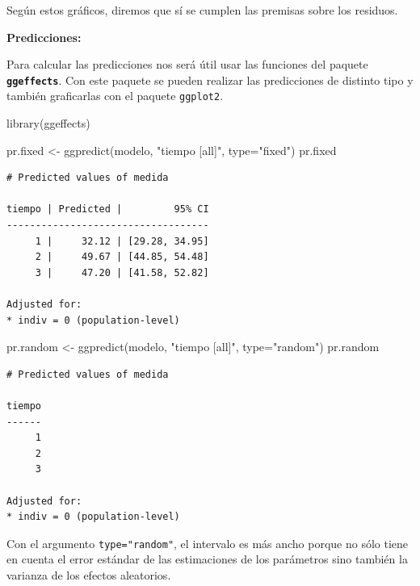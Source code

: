 \documentclass[
]{book}
\newenvironment{Shaded}{\begin{snugshade}}{\end{snugshade}}
\newcommand{\AttributeTok}[1]{\textcolor[rgb]{0.77,0.63,0.00}{#1}}
\newcommand{\FunctionTok}[1]{\textcolor[rgb]{0.00,0.00,0.00}{#1}}
\newcommand{\NormalTok}[1]{#1}
\newcommand{\OtherTok}[1]{\textcolor[rgb]{0.56,0.35,0.01}{#1}}
\newcommand{\StringTok}[1]{\textcolor[rgb]{0.31,0.60,0.02}{#1}}
\begin{document}
Según estos gráficos, diremos que sí se cumplen las premisas sobre los residuos.

\textbf{Predicciones:}

Para calcular las predicciones nos será útil usar las funciones del paquete \textbf{\texttt{ggeffects}}. Con este paquete se pueden realizar las predicciones de distinto tipo y también graficarlas con el paquete \texttt{ggplot2}.

\begin{Shaded}
\begin{Highlighting}[]
\FunctionTok{library}\NormalTok{(ggeffects)}
\end{Highlighting}
\end{Shaded}

\begin{Shaded}
\begin{Highlighting}[]
\NormalTok{pr.fixed }\OtherTok{\textless{}{-}} \FunctionTok{ggpredict}\NormalTok{(modelo, }\StringTok{"tiempo [all]"}\NormalTok{, }\AttributeTok{type=}\StringTok{"fixed"}\NormalTok{)}
\NormalTok{pr.fixed}
\end{Highlighting}
\end{Shaded}

\begin{verbatim}
# Predicted values of medida

tiempo | Predicted |         95% CI
-----------------------------------
     1 |     32.12 | [29.28, 34.95]
     2 |     49.67 | [44.85, 54.48]
     3 |     47.20 | [41.58, 52.82]

Adjusted for:
* indiv = 0 (population-level)
\end{verbatim}

\begin{Shaded}
\begin{Highlighting}[]
\NormalTok{pr.random }\OtherTok{\textless{}{-}} \FunctionTok{ggpredict}\NormalTok{(modelo, }\StringTok{"tiempo [all]"}\NormalTok{, }\AttributeTok{type=}\StringTok{"random"}\NormalTok{)}
\NormalTok{pr.random}
\end{Highlighting}
\end{Shaded}

\begin{verbatim}
# Predicted values of medida

tiempo
------
     1
     2
     3

Adjusted for:
* indiv = 0 (population-level)
\end{verbatim}

Con el argumento \texttt{type="random"}, el intervalo es más ancho porque no sólo tiene en cuenta el error estándar de las estimaciones de los parámetros sino también la varianza de los efectos aleatorios.
\end{document}
